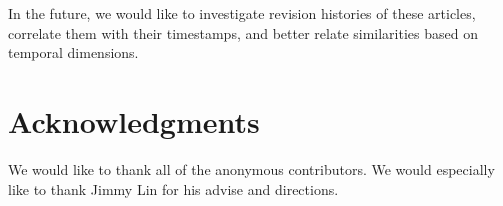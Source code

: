 \documentclass{acm_proc_article-sp}
\begin{document}
In the future, we would like to investigate revision histories of these articles, correlate them with their timestamps, and better relate similarities based on temporal dimensions. 

\section{Acknowledgments}
We would like to thank all of the anonymous contributors. We would especially like to thank Jimmy Lin for his advise and directions.

%

%
%
\balancecolumns
\end{document}
